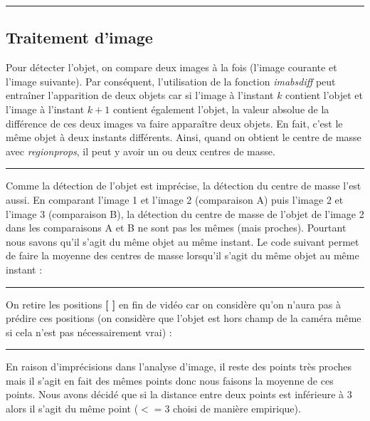 \lstset{caption=ProjetTSA.m}


\hrule

\subsection{Traitement d'image}

	Pour détecter l'objet, on compare deux images à la fois (l'image courante et l'image suivante). Par conséquent, l'utilisation de la fonction \emph{imabsdiff} peut entraîner l'apparition de deux objets car si l'image à l'instant $ k $ contient l'objet et l'image à l'instant $ k+1 $ contient également l'objet, la valeur absolue de la différence de ces deux images va faire apparaître deux objets. En fait, c'est le même objet à deux instants différents. Ainsi, quand on obtient le centre de masse avec \emph{regionprops}, il peut y avoir un ou deux centres de masse.
	
\lstset{caption=ProjetTSA.m}


\hrule
\phantom{}
\phantom{}

	Comme la détection de l'objet est imprécise, la détection du centre de masse l'est aussi. En comparant l'image 1 et l'image 2 (comparaison A) puis l'image 2 et l'image 3 (comparaison B), la détection du centre de masse de l'objet de l'image 2 dans les comparaisons A et B ne sont pas les mêmes (mais proches). Pourtant nous savons qu'il s'agit du même objet au même instant. Le code suivant permet de faire la moyenne des centres de masse lorsqu'il s'agit du même objet au même instant :

\lstset{caption=ProjetTSA.m}


\hrule
\phantom{}
\phantom{}

	On retire les positions \textbf{[ ]} en fin de vidéo car on considère qu'on n'aura pas à prédire ces positions (on considère que l'objet est hors champ de la caméra même si cela n'est pas nécessairement vrai) :

\lstset{caption=ProjetTSA.m}


\hrule
\phantom{}
\phantom{}

	En raison d'imprécisions dans l'analyse d'image, il reste des points très proches mais il s'agit en fait des mêmes points donc nous faisons la moyenne de ces points. Nous avons décidé que si la distance entre deux points est inférieure à $ 3 $ alors il s'agit du même point ($<=3$ choisi de manière empirique).


